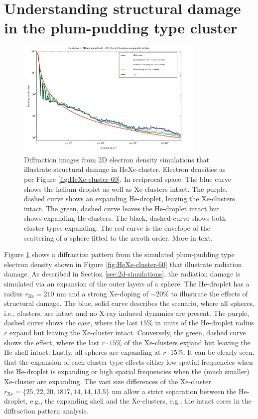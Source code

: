 \section{Understanding structural damage in the plum-pudding type cluster}\label{sec:helium-xenon-data}
\begin{figure}
	\centering
		\includegraphics[width=0.80\textwidth]{images/results/simulations-damage-explain.pdf}
	\caption[Simulated structural damage scenarios in HeXe-clusters.]{Diffraction images from 2D electron density simulations that illustrate structural damage in HeXe-cluster. Electron densities as per Figure \ref{fig:HeXe-cluster-60}. In reciprocal space: The blue curve shows the helium droplet as well as Xe-clusters intact. The purple, dashed curve shows an expanding He-droplet, leaving the Xe-clusters intact. The green, dashed curve leaves the He-droplet intact but shows expanding He-clusters. The black, dashed curve shows both cluster types expanding. The red curve is the envelope of the scattering of a sphere fitted to the zeroth order. More in text.}
	\label{fig:simulations-damage-explain}
\end{figure}
Figure \ref{fig:simulations-damage-explain} shows a diffraction pattern from the simulated plum-pudding type electron density shown in Figure \ref{fig:HeXe-cluster-60} that illustrate radiation damage. As described in Section \ref{sec:2d-simulations}, the radiation damage is simulated via an expansion of the outer layers of a sphere. The He-droplet has a radius $r_{\text{He}}=210$ nm and a strong Xe-doping of $\sim 20 \%$ to illustrate the effects of structural damage. The blue, solid curve describes the scenario, where all spheres, i.e., clusters, are intact and no X-ray induced dynamics are present. The purple, dashed curve shows the case, where the last $15 \%$ in units of the He-droplet radius $r$ expand but leaving the Xe-cluster intact. Conversely, the green, dashed curve shows the effect, where the last $r\cdot 15 \%$ of the Xe-clusters expand but leaving the He-shell intact. Lastly, all spheres are expanding at $r\cdot 15 \%$. It can be clearly seen, that the expansion of each cluster type effects either low spatial frequencies when the He-droplet is expanding or high spatial frequencies when the (much smaller) Xe-cluster are expanding. The vast size differences of the Xe-cluster $r_{\text{Xe}}=\{25, 22, 20, 18 17, 14, 14, 13.5\}$ nm allow a strict separation between the He-droplet, e.g., the expanding shell and the Xe-clusters, e.g., the intact cores in the diffraction pattern analysis.\\
